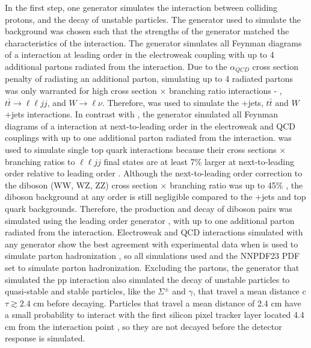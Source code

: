 In the first step, one \MC generator simulates the interaction between colliding protons, and the decay of unstable particles.  
The \MC generator used to simulate the background was chosen such that the strengths of the generator matched the characteristics of the 
interaction.  The \MADGRAPH generator \cite{madgraph} simulates all Feynman diagrams of a interaction at leading order in the electroweak 
coupling with up to 4 additional partons radiated from the interaction.  Due to the $\alpha_{QCD}$ cross section penalty of radiating an 
additional parton, simulating up to 4 radiated partons was only warranted for high cross section $\times$ branching ratio interactions - \DY, 
$t\bar{t} \rightarrow \ell\ell jj$, and $W \rightarrow \ell\nu$.  Therefore, \MADGRAPH was used to simulate the \DY+jets, $t\bar{t}$ 
and $W$+jets interactions.  In contrast with \MADGRAPH, the \POWHEG generator \cite{powheg} simulated all Feynman diagrams of a 
interaction at next-to-leading order in the electroweak and QCD couplings with up to one additional parton radiated from the interaction.  
\POWHEG was used to simulate single top quark interactions because their cross sections $\times$ branching ratios to $\ell\ell jj$ 
final states are at least 7\% larger at next-to-leading order relative to leading order \cite{singleTopNLOvsLO}.  
Although the next-to-leading order correction to the diboson (WW, WZ, ZZ) cross section $\times$ branching ratio was up to 45\% 
\cite{dibosonLOvsNLO}, the diboson background at any order is still negligible compared to the \DY+jets and top quark backgrounds.  Therefore, 
the production and decay of diboson pairs was simulated using the leading order \PYTHIA generator \cite{pythia8,Sjostrand:2006za}, 
with up to one additional parton radiated from the interaction.  Electroweak and QCD interactions simulated with any \MC generator show 
the best agreement with experimental data when \PYTHIA is used to simulate parton hadronization \cite{pythiaForHadronization}, so all 
simulations used \PYTHIA and the NNPDF23 PDF set \cite{nnpdf} to simulate parton hadronization.  Excluding the partons, the \MC generator 
that simulated the pp interaction also simulated the decay of unstable particles to quasi-stable and stable particles, like the $\Sigma^{\pm}$ 
and $\gamma$, that travel a mean distance c$\tau \gtrsim 2.4$ cm before decaying.  Particles that travel a mean distance of 2.4 cm have a 
small probability to interact with the first silicon pixel tracker layer located 4.4 cm from the interaction point \cite{cmsTdrPhysPerformance}, 
so they are not decayed before the detector response is simulated.

